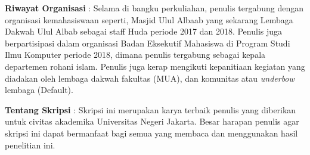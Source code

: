 \noindent \textbf{Riwayat Organisasi} : Selama di bangku perkuliahan, penulis tergabung dengan organisasi kemahasiswaan seperti, Masjid Ulul Albaab yang sekarang Lembaga Dakwah Ulul Albab sebagai staff Huda periode 2017 dan 2018. Penulis juga berpartisipasi dalam organisasi Badan Eksekutif Mahasiswa di Program Studi Ilmu Komputer periode 2018, dimana penulis tergabung sebagai kepala departemen rohani islam. Penulis juga kerap mengikuti kepanitiaan kegiatan yang diadakan oleh lembaga dakwah fakultas (MUA), dan komunitas atau \textit{underbow} lembaga (Default). 

\noindent \textbf{Tentang Skripsi} : Skripsi ini merupakan karya terbaik penulis yang diberikan untuk civitas akademika Universitas Negeri Jakarta. Besar harapan penulis agar skripsi ini dapat bermanfaat bagi semua yang membaca dan menggunakan hasil penelitian ini.